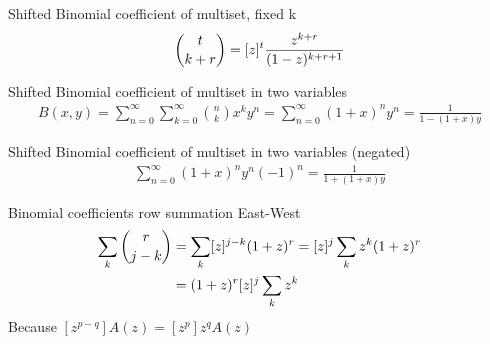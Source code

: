 \begin{identity}
    Shifted Binomial coefficient of multiset, fixed k
    \begin{align*}
        \binom{t}{k+r} = [z]^{t} \frac{z^{k+r}}{(1-z)^{k+r+1}}
    \end{align*}
\end{identity}
\begin{identity}
    Shifted Binomial coefficient of multiset in two variables~\cite[eq. 15]{faris2011generating}
    \begin{align*}
        B(x, y) = \sum_{n=0}^{\infty} \sum_{k=0}^{\infty} \binom{n}{k} x^k y^n
        = \sum_{n=0}^{\infty} (1 + x)^n y^n = \frac{1}{1 - (1 + x)y}
    \end{align*}
\end{identity}
\begin{identity}
    Shifted Binomial coefficient of multiset in two variables (negated)
    \begin{align*}
        \sum_{n=0}^{\infty} (1 + x)^n y^n (-1)^n = \frac{1}{1 + (1 + x)y}
    \end{align*}
\end{identity}
\begin{identity}
    Binomial coefficients row summation East-West
    \begin{align*}
        \sum_{k} \binom{r}{j-k}
        &= \sum_{k} [z]^{j-k}(1+z)^r
        = [z]^{j} \sum_{k} z^k (1+z)^r \\
        &= (1+z)^r [z]^{j} \sum_{k} z^k
    \end{align*}
    Because $[z^{p-q}] A(z)=[z^p] z^{q} A(z)$
\end{identity}




\clearpage
